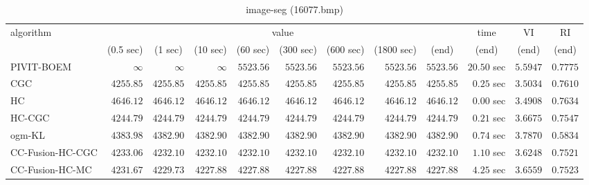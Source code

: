 \begin{table}[H]
\scriptsize
\centering
\caption{image-seg (16077.bmp)}
\label{tab:anytimetable-image-seg-16077.bmp}
\begin{tabular}{lrrrrrrrrrrr}
\toprule
           algorithm &                                   \multicolumn{8}{c}{value} & \multicolumn{1}{c}{time}    & \multicolumn{1}{c}{VI}  & \multicolumn{1}{c}{RI} \\  
\cmidrule(lr){2-9}\cmidrule(lr){10-10} \cmidrule(lr){11-11} \cmidrule(lr){12-12}   
                     & \multicolumn{1}{c}{(0.5 sec)} & \multicolumn{1}{c}{(1 sec)} & \multicolumn{1}{c}{(10 sec)} & \multicolumn{1}{c}{(60 sec)} & \multicolumn{1}{c}{(300 sec)} & \multicolumn{1}{c}{(600 sec)} & \multicolumn{1}{c}{(1800 sec)} & \multicolumn{1}{c}{(end)} & \multicolumn{1}{c}{(end)}    & \multicolumn{1}{c}{(end)}   & \multicolumn{1}{c}{(end)}  \\ \midrule 
          PIVIT-BOEM & $\infty$ & $\infty$ & $\infty$ & $      5523.56$ & $      5523.56$ & $      5523.56$ & $      5523.56$ & $      5523.56$ & $        20.50$ sec    & $       5.5947$  & $       0.7775$ \\ 
                 CGC & $      4255.85$ & $      4255.85$ & $      4255.85$ & $      4255.85$ & $      4255.85$ & $      4255.85$ & $      4255.85$ & $      4255.85$ & $         0.25$ sec    & $       3.5034$  & $       0.7610$ \\ 
                  HC & $      4646.12$ & $      4646.12$ & $      4646.12$ & $      4646.12$ & $      4646.12$ & $      4646.12$ & $      4646.12$ & $      4646.12$ & $         0.00$ sec    & $       3.4908$  & $       0.7634$ \\ 
              HC-CGC & $      4244.79$ & $      4244.79$ & $      4244.79$ & $      4244.79$ & $      4244.79$ & $      4244.79$ & $      4244.79$ & $      4244.79$ & $         0.21$ sec    & $       3.6675$  & $       0.7547$ \\ 
              ogm-KL & $      4383.98$ & $      4382.90$ & $      4382.90$ & $      4382.90$ & $      4382.90$ & $      4382.90$ & $      4382.90$ & $      4382.90$ & $         0.74$ sec    & $       3.7870$  & $       0.5834$ \\ 
    CC-Fusion-HC-CGC & $      4233.06$ & $      4232.10$ & $      4232.10$ & $      4232.10$ & $      4232.10$ & $      4232.10$ & $      4232.10$ & $      4232.10$ & $         1.10$ sec    & $       3.6248$  & $       0.7521$ \\ 
     CC-Fusion-HC-MC & $      4231.67$ & $      4229.73$ & $      4227.88$ & $      4227.88$ & $      4227.88$ & $      4227.88$ & $      4227.88$ & $      4227.88$ & $         4.25$ sec    & $       3.6559$  & $       0.7523$ \\ 

\end{tabular}
\end{table}
